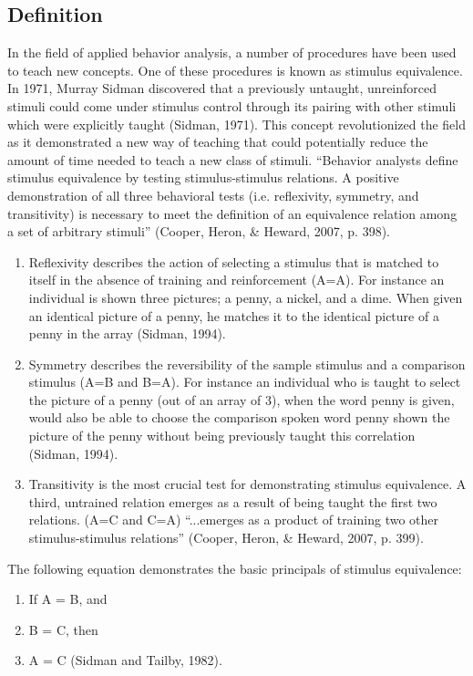 \subsection{Definition}
In the field of applied behavior analysis, a number of procedures have been used to teach new concepts.  One of these procedures is known as stimulus equivalence.  In 1971, Murray Sidman discovered that a previously untaught, unreinforced stimuli could come under stimulus control through its pairing with other stimuli which were explicitly taught (Sidman, 1971). This concept revolutionized the field as it demonstrated a new way of teaching that could potentially reduce the amount of time needed to teach a new class of stimuli.   ``Behavior analysts define stimulus equivalence by testing stimulus-stimulus relations.  A positive demonstration of all three behavioral tests (i.e. reflexivity, symmetry, and transitivity) is necessary to meet the definition of an equivalence relation among a set of arbitrary stimuli'' (Cooper, Heron, \& Heward, 2007, p. 398). 
\begin{enumerate}
\item Reflexivity describes the action of selecting a stimulus that is matched to itself in the absence of training and reinforcement (A=A).  For instance an individual is shown three pictures; a penny, a nickel, and a dime.  When given an identical picture of a penny, he matches it to the identical picture of a penny in the array (Sidman, 1994).
\item Symmetry describes the reversibility of the sample stimulus and a comparison stimulus (A=B and B=A).  For instance an individual who is taught to select the picture of a penny (out of an array of 3), when the word penny is given, would also be able to choose the comparison spoken word penny shown the picture of the penny without being previously taught this correlation (Sidman, 1994).  
\item Transitivity is the most crucial test for demonstrating stimulus equivalence.  A third, untrained relation emerges as a result of being taught the first two relations.  (A=C and C=A) ``...emerges as a product of training two other stimulus-stimulus relations'' (Cooper, Heron, \& Heward, 2007, p. 399).  
\end{enumerate}

The following equation demonstrates the basic principals of stimulus equivalence:
\begin{enumerate}
\item If A = B, and
\item B = C, then
\item  A = C (Sidman and Tailby, 1982).
\end{enumerate}


